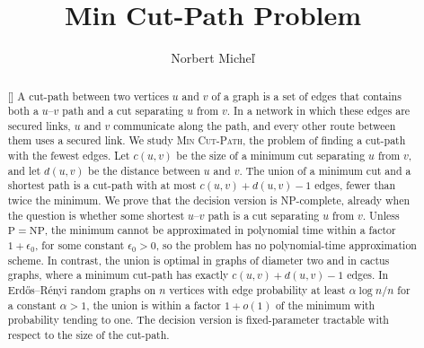 \documentclass[a4paper,fleqn]{cas-sc}
\numberwithin{equation}{section}
\theoremstyle{definition}
\theoremstyle{plain}
\theoremstyle{remark}
\newcommand{\MinCutPath}{\textsc{Min Cut-Path}}
\begin{document}
\let\WriteBookmarks\relax
\def\floatpagepagefraction{1}
\def\textpagefraction{.001}



\title[mode = title]{Min Cut-Path Problem}

\author[1]{Norbert Micheľ}

\cormark[1]




\begin{abstract}[\abstractname]
A cut-path between two vertices $u$ and $v$ of a graph is a set of edges that contains both a $u$--$v$ path and a cut separating $u$ from $v$.
In a network in which these edges are secured links, $u$ and $v$ communicate along the path, and every other route between them uses a secured link.
We study \MinCutPath{}, the problem of finding a cut-path with the fewest edges.
Let $c(u,v)$ be the size of a minimum cut separating $u$ from $v$, and let $d(u,v)$ be the distance between $u$ and $v$.
The union of a minimum cut and a shortest path is a cut-path with at most $c(u,v) + d(u,v) - 1$ edges, fewer than twice the minimum.
We prove that the decision version is NP-complete, already when the question is whether some shortest $u$--$v$ path is a cut separating $u$ from $v$.
Unless $\mathrm{P} = \mathrm{NP}$, the minimum cannot be approximated in polynomial time within a factor $1+\epsilon_0$, for some constant $\epsilon_0 > 0$, so the problem has no polynomial-time approximation scheme.
In contrast, the union is optimal in graphs of diameter two and in cactus graphs, where a minimum cut-path has exactly $c(u,v) + d(u,v) - 1$ edges.
In Erdős–Rényi random graphs on $n$ vertices with edge probability at least $\alpha \log n / n$ for a constant $\alpha > 1$, the union is within a factor $1+o(1)$ of the minimum with probability tending to one.
The decision version is fixed-parameter tractable with respect to the size of the cut-path.
\end{abstract}
\end{document}
